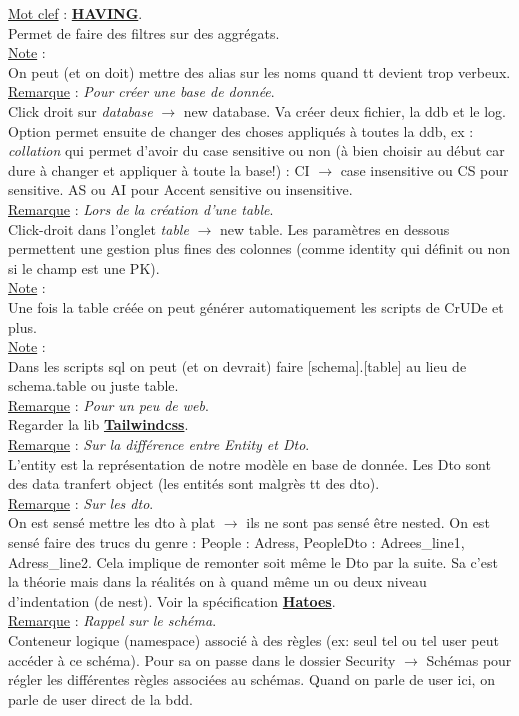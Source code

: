 \documentclass[a4paper,12pt,twoside]{article}
\newcommand{\urlcolor}{magenta}  %
\newcommand{\keycolor}{purple} %
\newcommand{\rem}[2]{\noindent\underline{Remarque} : \textit{#1}.\\ \indent #2}
\newcommand{\note}[1]{\noindent\underline{Note} : \\ \indent #1}
\newcommand{\keyref}[2]{\hypersetup{urlcolor=\keycolor} \href{#1}{\textbf{#2}}\hypersetup{urlcolor=\urlcolor}}
\newcommand{\keyword}[3]{\noindent\underline{Mot clef} : \keyref{#1}{#2}. \\ \indent #3}
\begin{document}
\keyword{https://sql.sh/cours/having}{HAVING}{Permet de faire des filtres sur des aggrégats.}\\

\note{On peut (et on doit) mettre des alias sur les noms quand tt devient trop verbeux.}\\

\rem{Pour créer une base de donnée}{Click droit sur \textit{database} $\to$ {new database}. Va créer deux fichier, la ddb et le log. Option permet ensuite de changer des choses appliqués à toutes la ddb, ex : \textit{collation} qui permet d'avoir du case sensitive ou non (à bien choisir au début car dure à changer et appliquer à toute la base!) : CI $\to$ case insensitive ou CS pour sensitive. AS ou AI pour Accent sensitive ou insensitive.}\\

\rem{Lors de la création d'une table}{Click-droit dans l'onglet \textit{table} $\to$ {new table}. Les paramètres en dessous permettent une gestion plus fines des colonnes (comme identity qui définit ou non si le champ est une PK).}\\

\note{Une fois la table créée on peut générer automatiquement les scripts de CrUDe et plus. }\\

\note{Dans les scripts sql on peut (et on devrait) faire [schema].[table] au lieu de schema.table ou juste table.}\\

\rem{Pour un peu de web}{Regarder la lib \keyref{https://tailwindcss.com/}{Tailwindcss}.}\\

\rem{Sur la différence entre Entity et Dto}{L'entity est la représentation de notre modèle en base de donnée. Les Dto sont des data tranfert object (les entités sont malgrès tt des dto).}\\

\rem{Sur les dto}{On est sensé mettre les dto à plat $\to$ ils ne sont pas sensé être nested. On est sensé faire des trucs du genre : People : Adress, PeopleDto : Adrees_line1, Adress_line2. Cela implique de remonter soit même le Dto par la suite. Sa c'est la théorie mais dans la réalités on à quand même un ou deux niveau d'indentation (de nest). Voir la spécification \keyref{https://en.wikipedia.org/wiki/HATEOAS}{Hatoes}.}\\

\rem{Rappel sur le schéma}{Conteneur logique (namespace) associé à des règles (ex: seul tel ou tel user peut accéder à ce schéma). Pour sa on passe dans le dossier Security $\to$ Schémas pour régler les différentes règles associées au schémas. Quand on parle de user ici, on parle de user direct de la bdd.}\\
\end{document}
